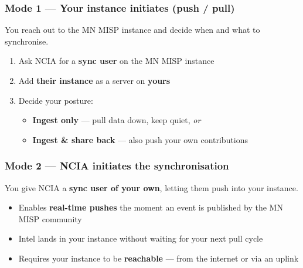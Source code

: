 \begin{frame}
    \frametitle{Mode 1 --- Your instance initiates (push / pull)}

    You reach out to the MN MISP instance and decide when and what to synchronise.

    \vspace{0.5em}

    \begin{enumerate}
        \item Ask NCIA for a \textbf{sync user} on the MN MISP instance
        \item Add \textbf{their instance} as a server on \textbf{yours}
        \item Decide your posture:
            \begin{itemize}
                \item[] \textbf{Ingest only} --- pull data down, keep quiet, \emph{or}
                \item[] \textbf{Ingest \& share back} --- also push your own contributions
            \end{itemize}
    \end{enumerate}

    \vspace{0.5em}

\end{frame}


\begin{frame}
    \frametitle{Mode 2 --- NCIA initiates the synchronisation}

    You give NCIA a \textbf{sync user of your own}, letting them push into your instance.

    \vspace{0.5em}

    \begin{itemize}
        \item Enables \textbf{real-time pushes} the moment an event is published by the
              MN MISP community
        \item Intel lands in your instance without waiting for your next pull cycle
        \item Requires your instance to be \textbf{reachable} --- from the internet or via an uplink
    \end{itemize}

    \vspace{0.5em}

\end{frame}


